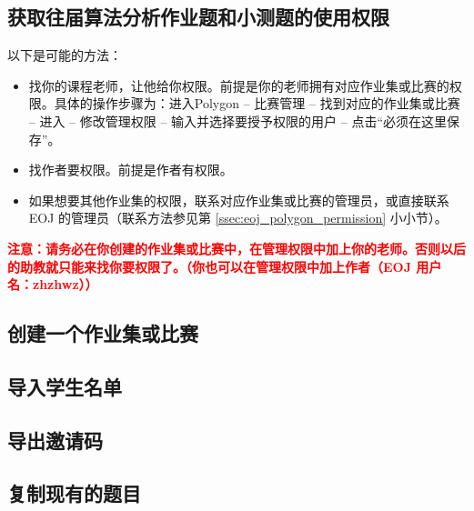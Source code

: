 \documentclass[oneside]{book}
\begin{document}
\label{sec:polygon_operating_procedures}

\subsection{获取往届算法分析作业题和小测题的使用权限}

\label{ssec:permission_get}

以下是可能的方法：

\begin{itemize}
    \item 找你的课程老师，让他给你权限。前提是你的老师拥有对应作业集或比赛的权限。具体的操作步骤为：进入Polygon -- 比赛管理 -- 找到对应的作业集或比赛 -- 进入 -- 修改管理权限 -- 输入并选择要授予权限的用户 -- 点击``必须在这里保存''。
    \item 找作者要权限。前提是作者有权限。
    \item 如果想要其他作业集的权限，联系对应作业集或比赛的管理员，或直接联系 EOJ 的管理员（联系方法参见第 \ref{ssec:eoj_polygon_permission} 小小节）。
\end{itemize}

\textbf{\textcolor{red}{注意：请务必在你创建的作业集或比赛中，在管理权限中加上你的老师。否则以后的助教就只能来找你要权限了。（你也可以在管理权限中加上作者（EOJ 用户名：zhzhwz））}}

\subsection{创建一个作业集或比赛}

\label{ssec:create_homework_set}



\subsection{导入学生名单}

\label{ssec:import_student_list}

\subsection{导出邀请码}

\label{ssec:export_inviting_code}

\subsection{复制现有的题目}

\label{ssec:copy_exist_problem}
\end{document}
